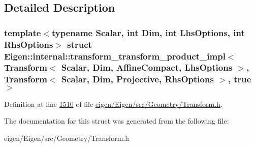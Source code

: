 \subsection{Detailed Description}
\subsubsection*{template$<$typename Scalar, int Dim, int Lhs\+Options, int Rhs\+Options$>$\newline
struct Eigen\+::internal\+::transform\+\_\+transform\+\_\+product\+\_\+impl$<$ Transform$<$ Scalar, Dim, Affine\+Compact, Lhs\+Options $>$, Transform$<$ Scalar, Dim, Projective, Rhs\+Options $>$, true $>$}



Definition at line \hyperlink{eigen_2_eigen_2src_2_geometry_2_transform_8h_source_l01510}{1510} of file \hyperlink{eigen_2_eigen_2src_2_geometry_2_transform_8h_source}{eigen/\+Eigen/src/\+Geometry/\+Transform.\+h}.



The documentation for this struct was generated from the following file\+:\begin{DoxyCompactItemize}
\item 
eigen/\+Eigen/src/\+Geometry/\+Transform.\+h\end{DoxyCompactItemize}
